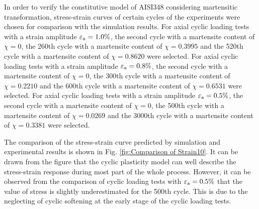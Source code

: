 \documentclass[final,5p,times,onecolumn,10pt,sort&compress]{elsarticle}
\begin{document}
%
%

In order to verify the constitutive model of AISI348 considering martensitic transformation, stress-strain curves of certain cycles of the experiments were chosen for comparison with the simulation results. For axial cyclic loading tests with a strain amplitude $\varepsilon _{\rm a}=1.0\%$, the second cycle with a martensite content of $\chi=0$, the 260th cycle with a martensite content of $\chi=0.3995$ and the 520th cycle with a martensite content of $\chi=0.8620$ were selected. For axial cyclic loading tests with a strain amplitude $\varepsilon _{\rm a}=0.8\%$, the second cycle with a martensite content of $\chi=0$, the 300th cycle with a martensite content of $\chi=0.2210$ and the 600th cycle with a martensite content of $\chi=0.6531$ were selected. For axial cyclic loading tests with a strain amplitude $\varepsilon _{\rm a}=0.5\%$, the second cycle with a martensite content of $\chi=0$, the 500th cycle with a martensite content of $\chi=0.0269$ and the 3000th cycle with a martensite content of $\chi=0.3381$ were selected.

The comparison of the stress-strain curve predicted by simulation and experimental results is shown in Fig. \ref{fig:Comparison of Strain10}. It can be drawn from the figure that the cyclic plasticity model can well describe the stress-strain response during most part of the whole process. However, it can be observed from the comparison of cyclic loading tests with $\varepsilon _{\rm a}=0.5\%$ that the value of stress is slightly underestimated for the 500th cycle. This is due to the neglecting of cyclic softening at the early stage of the cyclic loading tests.
\end{document}
